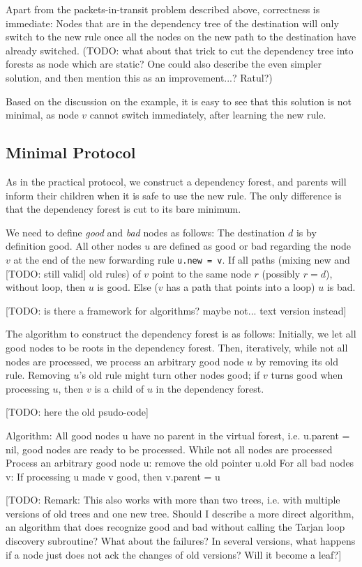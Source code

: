 Apart from the packets-in-transit problem described above, correctness is immediate: Nodes that are in the dependency tree of the destination will only switch to the new rule once all the nodes on the new path to the destination have already switched. (TODO: what about that trick to cut the dependency tree into forests as node which are static? One could also describe the even simpler solution, and then mention this as an improvement...? Ratul?)

Based on the discussion on the example, it is easy to see that this solution is not minimal, as node $v$ cannot switch immediately, after learning the new rule.

\subsection{Minimal Protocol}
\label{sec:minimal}

As in the practical protocol, we construct a dependency forest, and parents will inform their children when it is safe to use the new rule. The only difference is that the dependency forest is cut to its bare minimum.

We need to define \emph{good} and \emph{bad} nodes as follows: The destination $d$ is by definition good. All other nodes $u$ are defined as good or bad regarding the node $v$ at the end of the new forwarding rule \texttt{u.new = v}. If all paths (mixing new and [TODO: still valid] old rules) of $v$ point to the same node $r$ (possibly $r = d$), without loop, then $u$ is good. Else ($v$ has a path that points into a loop) $u$ is bad.

[TODO: is there a framework for algorithms? maybe not... text version instead]

The algorithm to construct the dependency forest is as follows: Initially, we let all good nodes to be roots in the dependency forest. Then, iteratively, while not all nodes are processed, we process an arbitrary good node $u$ by removing its old rule. Removing $u$'s old rule might turn other nodes good; if $v$ turns good when processing $u$, then $v$ is a child of $u$ in the dependency forest.

[TODO: here the old psudo-code]

Algorithm:
All good nodes u have no parent in the virtual forest, i.e. u.parent = nil, good nodes are ready to be processed.
While not all nodes are processed
	Process an arbitrary good node u: remove the old pointer u.old
	For all bad nodes v:
		If processing u made v good, then v.parent = u

[TODO: Remark: This also works with more than two trees, i.e. with multiple versions of old trees and one new tree. Should I describe a more direct algorithm, an algorithm that does recognize good and bad without calling the Tarjan loop discovery subroutine? What about the failures? In several versions, what happens if a node just does not ack the changes of old versions? Will it become a leaf?]




